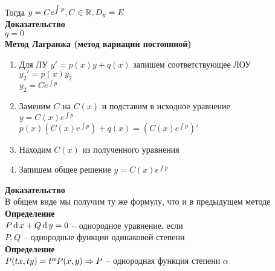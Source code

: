 \documentclass[12pt]{article}
\begin{document}
Тогда $y = Ce^{\int p}, C \in \mathbb{R}, D_y = E$\\
\textbf{Доказательство}\\
$q = 0$\\
\textbf{Метод Лагранжа (метод вариации постоянной)}
\begin{enumerate}
    \item Для ЛУ $y' = p(x)y + q(x)$ запишем соответствующее ЛОУ\\
    $y_2'=p(x)y_2$\\
    $y_2=Ce^{\int p}$
    \item Заменим $C$ на $C(x)$ и подставим в исходное уравнение\\
    $y = C(x)e^{\int p}$\\
    $p(x)(C(x)e^{\int p})+q(x) = (C(x)e^{\int p})'$
    \item Находим $C(x)$ из полученного уравнения
    \item Запишем общее решение $y=C(x)e^{\int p}$
\end{enumerate}
\textbf{Доказательство}\\
В общем виде мы получим ту же формулу, что и в предыдущем методе\\
\textbf{Определение}\\
$P\operatorname{d} x + Q \operatorname{d} y = 0$ -- однородное уравнение, если\\
$P, Q$ -- однородные функции одинаковой степени\\
\textbf{Определение}\\
$P(tx, ty) = t^\alpha P(x, y) \Rightarrow P$ -- однородная функция степени $\alpha$
\end{document}
